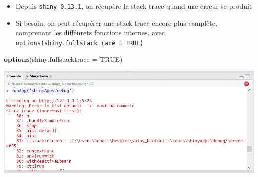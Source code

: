 \documentclass[
]{article}
\newenvironment{Shaded}{\begin{snugshade}}{\end{snugshade}}
\newcommand{\AttributeTok}[1]{\textcolor[rgb]{0.13,0.29,0.53}{#1}}
\newcommand{\ConstantTok}[1]{\textcolor[rgb]{0.56,0.35,0.01}{#1}}
\newcommand{\FunctionTok}[1]{\textcolor[rgb]{0.13,0.29,0.53}{\textbf{#1}}}
\newcommand{\NormalTok}[1]{#1}
\providecommand{\tightlist}{%
  \setlength{\itemsep}{0pt}\setlength{\parskip}{0pt}}
\begin{document}
\begin{itemize}
\tightlist
\item
  Depuis \texttt{shiny\_0.13.1}, on récupère la stack trace quand une
  erreur se produit
\item
  Si besoin, on peut récupérer une stack trace encore plus complète,
  comprenant les diffénrets fonctions internes, avec
  \texttt{options(shiny.fullstacktrace\ =\ TRUE)}
\end{itemize}

\begin{Shaded}
\begin{Highlighting}[]
\FunctionTok{options}\NormalTok{(}\AttributeTok{shiny.fullstacktrace =} \ConstantTok{TRUE}\NormalTok{)}
\end{Highlighting}
\end{Shaded}

\includegraphics{img/debug_stack.png}
\end{document}
